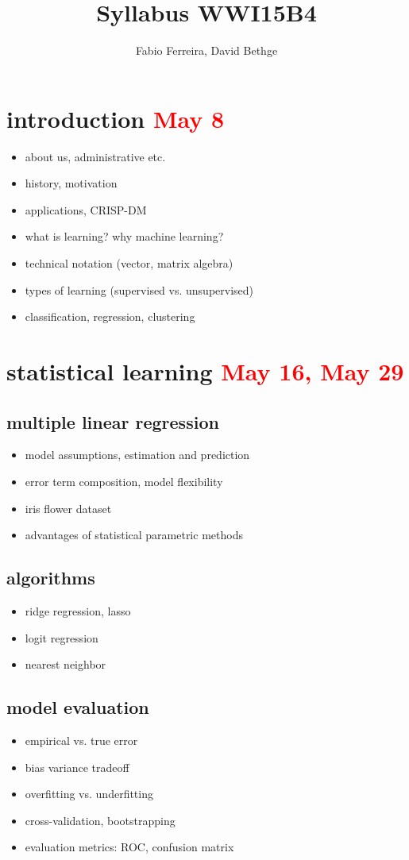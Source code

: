 \documentclass[a4paper]{article}
\title{Syllabus WWI15B4}
\author{Fabio Ferreira, David Bethge}
\begin{document}
\maketitle


\section{introduction \textcolor{red}{May 8}}
\begin{itemize}
\item about us, administrative etc.
\item history, motivation
\item applications, CRISP-DM
\item what is learning? why machine learning?
\item technical notation (vector, matrix algebra)
\item types of learning (supervised vs. unsupervised)
\item classification, regression, clustering
\end{itemize}

\section{statistical learning \textcolor{red}{May 16, May 29}}
\subsection{multiple linear regression}
\begin{itemize}
\item model assumptions, estimation and prediction
\item error term composition, model flexibility
\item iris flower dataset
\item advantages of statistical parametric methods


\end{itemize}
\subsection{algorithms}
\begin{itemize}
\item ridge regression, lasso 
\item logit regression
\item nearest neighbor
\end{itemize}

\subsection{model evaluation}
\begin{itemize}
\item empirical vs. true error
\item bias variance tradeoff
\item overfitting vs. underfitting
\item cross-validation, bootstrapping
\item evaluation metrics: ROC, confusion matrix
\end{itemize}
\end{document}
